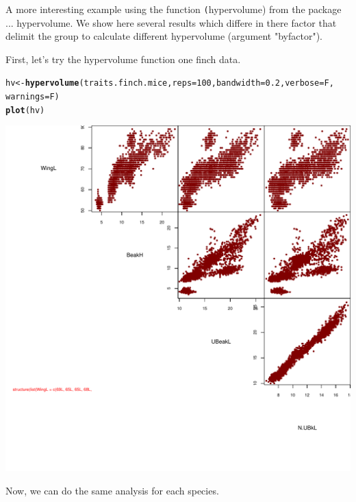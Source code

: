 \documentclass[12pt]{article}\usepackage[]{graphicx}\usepackage[]{color}
\makeatletter
\def\maxwidth{ %
  \ifdim\Gin@nat@width>\linewidth
    \linewidth
  \else
    \Gin@nat@width
  \fi
}
\newcommand{\hlnum}[1]{\textcolor[rgb]{0.686,0.059,0.569}{#1}}%
\newcommand{\hlstd}[1]{\textcolor[rgb]{0.345,0.345,0.345}{#1}}%
\newcommand{\hlkwb}[1]{\textcolor[rgb]{0.69,0.353,0.396}{#1}}%
\newcommand{\hlkwc}[1]{\textcolor[rgb]{0.333,0.667,0.333}{#1}}%
\newcommand{\hlkwd}[1]{\textcolor[rgb]{0.737,0.353,0.396}{\textbf{#1}}}%
\newenvironment{kframe}{%
 \def\at@end@of@kframe{}%
 \ifinner\ifhmode%
  \def\at@end@of@kframe{\end{minipage}}%
  \begin{minipage}{\columnwidth}%
 \fi\fi%
 \def\FrameCommand##1{\hskip\@totalleftmargin \hskip-\fboxsep
 \colorbox{shadecolor}{##1}\hskip-\fboxsep
     \hskip-\linewidth \hskip-\@totalleftmargin \hskip\columnwidth}%
 \MakeFramed {\advance\hsize-\width
   \@totalleftmargin\z@ \linewidth\hsize
   \@setminipage}}%
 {\par\unskip\endMakeFramed%
 \at@end@of@kframe}
\newenvironment{knitrout}{}{} %
\newcommand{\code}[1]{{{\tt #1}}}
\makeatother
\begin{document}
\newpage
A more interesting example using the function \code(hypervolume) from the package ... hypervolume.  We show here several results which differe in there factor that delimit the group to calculate different hypervolume (argument "byfactor"). 

First, let's try the hypervolume function one finch data.
\begin{knitrout}
\color{fgcolor}\begin{kframe}
\begin{alltt}
\hlstd{hv} \hlkwb{<-} \hlkwd{hypervolume}\hlstd{(traits.finch.mice,} \hlkwc{reps} \hlstd{=} \hlnum{100}\hlstd{,} \hlkwc{bandwidth} \hlstd{=} \hlnum{0.2}\hlstd{,} \hlkwc{verbose} \hlstd{= F,}
    \hlkwc{warnings} \hlstd{= F)}
\hlkwd{plot}\hlstd{(hv)}
\end{alltt}
\end{kframe}
\includegraphics[width=\maxwidth]{figure/unnamed-chunk-36} 

\end{knitrout}


Now, we can do the same analysis for each species.
\end{document}
